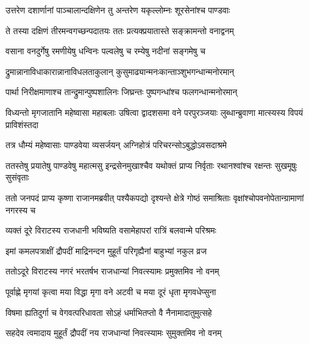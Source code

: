 \twolineshloka
{उत्तरेण दशार्णानां पाञ्चालान्दक्षिणेन तु}
{अन्तरेण यकृल्लोम्नः शूरसेनांश्च पाण्डवाः}


\twolineshloka
{ते तस्या दक्षिणं तीरमन्वगच्छन्पदातयः}
{ततः प्रत्यक्प्रयातास्ते सङ्क्रामन्तो वनाद्वनम्}


\twolineshloka
{वसाना वनदुर्गेषु रमणीयेषु धन्विनः}
{पल्वलेषु च रम्येषु नदीनां सङ्गमेषु च}


\twolineshloka
{द्रुमान्नानाविधाकारान्नानाविधलताकुलान्}
{कुसुमाढ्यान्मनःकान्ताञ्शुभगन्धान्मनोरमान्}


\twolineshloka
{पार्था निरीक्षमाणाश्च तान्द्रुमान्पुष्पशालिनः}
{जिघ्रन्तः पुष्पगन्धांश्च फलगन्धान्मनोरमान्}


\threelineshloka
{विध्यन्तो मृगजातानि महेष्वासा महाबलाः}
{उषित्वा द्वादशसमा वने परपुरञ्जयाः}
{लुब्धान्ब्रुवाणा मात्स्यस्य विपयं प्राविशंस्तदा}


\twolineshloka
{तत्र धौम्यं महेष्वासाः पाण्डवेया व्यसर्जयन्}
{अग्निहोत्रं परिचरन्सोऽबुद्धोऽवसदाश्रमे}


\threelineshloka
{ततस्तेषु प्रयातेषु पाण्डवेषु महात्मसु}
{इन्द्रसेनमुखाश्चैव यथोक्तं प्राप्य निर्वृताः}
{रथानश्वांश्च रक्षन्तः सुखमूषुः सुसंवृताः}


\onelineshloka
{ततो जनपदं प्राप्य कृष्णा राजानमब्रवीत्}
\twolineshloka
{पश्यैकपद्यो दृश्यन्ते क्षेत्रे गोष्ठं समाश्रिताः}
{वृक्षांश्चोपवनोपेतान्ग्रामाणां नगरस्य च}


\twolineshloka
{व्यक्तं दूरे विराटस्य राजधानी भविष्यति}
{वसामेहापरां रात्रिं बलवान्मे परिश्रमः}




\twolineshloka
{इमां कमलपत्राक्षीं द्रौपदीं माद्रिनन्दन}
{मुहूर्तं परिगृह्यैनां बाहुभ्यां नकुल व्रज}


\twolineshloka
{ततोऽदूरे विराटस्य नगरं भरतर्षभ}
{राजधान्यां निवत्स्यामः प्रमुक्तमिव नो वनम्}




\twolineshloka
{पूर्वाह्णे मृगयां कृत्वा मया विद्धा मृगा वने}
{अटवी च मया दूरं धृता मृगवधेप्सुना}


\twolineshloka
{विषमा ह्यतिदुर्गा च वेगवत्परिधावता}
{सोऽहं धर्माभितप्तो वै नैनामादातुमुत्सहे}




\twolineshloka
{सहदेव त्वमादाय मुहूर्तं द्रौपदीं नय}
{राजधान्यां निवत्स्यामः सुमुक्तमिव नो वनम्}





